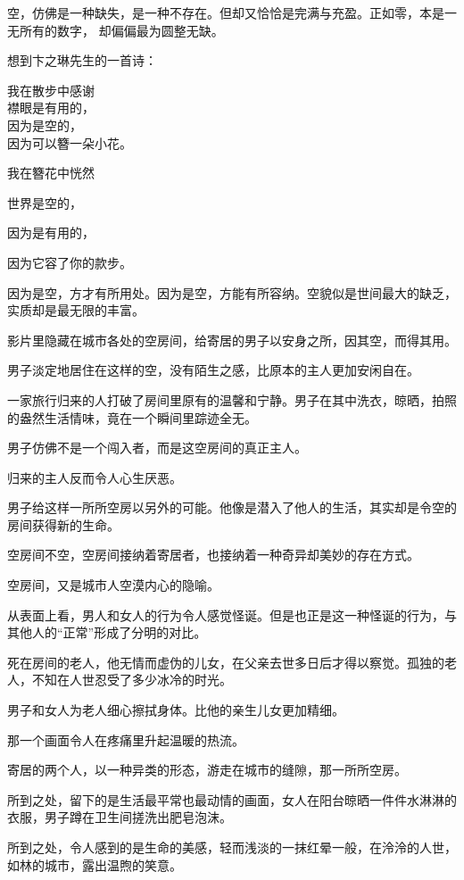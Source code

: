 		空，仿佛是一种缺失，是一种不存在。但却又恰恰是完满与充盈。正如零，本是一无所有的数字，
	却偏偏最为圆整无缺。

		想到卞之琳先生的一首诗：

		\longpoem{}{}{}
			我在散步中感谢 \\
			襟眼是有用的，\\
			因为是空的，\\
			因为可以簪一朵小花。
		\endlongpoem

		我在簪花中恍然\par
		世界是空的，\par
		因为是有用的，\par
		因为它容了你的款步。\par
		因为是空，方才有所用处。因为是空，方能有所容纳。空貌似是世间最大的缺乏，实质却是最无限的丰富。\par
		影片里隐藏在城市各处的空房间，给寄居的男子以安身之所，因其空，而得其用。\par
		男子淡定地居住在这样的空，没有陌生之感，比原本的主人更加安闲自在。\par
		一家旅行归来的人打破了房间里原有的温馨和宁静。男子在其中洗衣，晾晒，拍照的盎然生活情味，竟在一个瞬间里踪迹全无。\par
		男子仿佛不是一个闯入者，而是这空房间的真正主人。\par
		归来的主人反而令人心生厌恶。\par
		男子给这样一所所空房以另外的可能。他像是潜入了他人的生活，其实却是令空的房间获得新的生命。\par
		空房间不空，空房间接纳着寄居者，也接纳着一种奇异却美妙的存在方式。\par
		空房间，又是城市人空漠内心的隐喻。\par
		从表面上看，男人和女人的行为令人感觉怪诞。但是也正是这一种怪诞的行为，与其他人的“正常”形成了分明的对比。\par
		死在房间的老人，他无情而虚伪的儿女，在父亲去世多日后才得以察觉。孤独的老人，不知在人世忍受了多少冰冷的时光。\par
		男子和女人为老人细心擦拭身体。比他的亲生儿女更加精细。\par
		那一个画面令人在疼痛里升起温暖的热流。\par
		寄居的两个人，以一种异类的形态，游走在城市的缝隙，那一所所空房。\par
		所到之处，留下的是生活最平常也最动情的画面，女人在阳台晾晒一件件水淋淋的衣服，男子蹲在卫生间搓洗出肥皂泡沫。\par
		所到之处，令人感到的是生命的美感，轻而浅淡的一抹红晕一般，在泠泠的人世，如林的城市，露出温煦的笑意。\par
